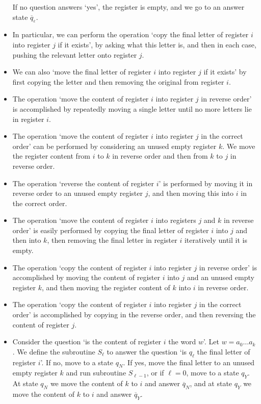 \begin{itemize}
	If no question answers `yes', the register is empty, and we go to an answer state \( \overline q_\varepsilon \).
	\item In particular, we can perform the operation `copy the final letter of register \( i \) into register \( j \) if it exists', by asking what this letter is, and then in each case, pushing the relevant letter onto register \( j \).
	\item We can also `move the final letter of register \( i \) into register \( j \) if it exists' by first copying the letter and then removing the original from register \( i \).
	\item The operation `move the content of register \( i \) into register \( j \) in reverse order' is accomplished by repeatedly moving a single letter until no more letters lie in register \( i \).
	\item The operation `move the content of register \( i \) into register \( j \) in the correct order' can be performed by considering an unused empty register \( k \).
	We move the register content from \( i \) to \( k \) in reverse order and then from \( k \) to \( j \) in reverse order.
	\item The operation `reverse the content of register \( i \)' is performed by moving it in reverse order to an unused empty register \( j \), and then moving this into \( i \) in the correct order.
	\item The operation `move the content of register \( i \) into registers \( j \) and \( k \) in reverse order' is easily performed by copying the final letter of register \( i \) into \( j \) and then into \( k \), then removing the final letter in register \( i \) iteratively until it is empty.
	\item The operation `copy the content of register \( i \) into register \( j \) in reverse order' is accomplished by moving the content of register \( i \) into \( j \) and an unused empty register \( k \), and then moving the register content of \( k \) into \( i \) in reverse order.
	\item The operation `copy the content of register \( i \) into register \( j \) in the correct order' is accomplished by copying in the reverse order, and then reversing the content of register \( j \).
	\item Consider the question `is the content of register \( i \) the word \( w \)'.
	Let \( w = a_0 \dots a_k \).
	We define the subroutine \( S_\ell \) to answer the question `is \( q_\ell \) the final letter of register \( i \)'.
	If no, move to a state \( q_N \).
	If yes, move the final letter to an unused empty register \( k \) and run subroutine \( S_{\ell-1} \), or if \( \ell = 0 \), move to a state \( q_Y \).
	At state \( q_N \) we move the content of \( k \) to \( i \) and answer \( \overline q_N \), and at state \( q_Y \) we move the content of \( k \) to \( i \) and answer \( \overline q_Y \).
\end{itemize}

